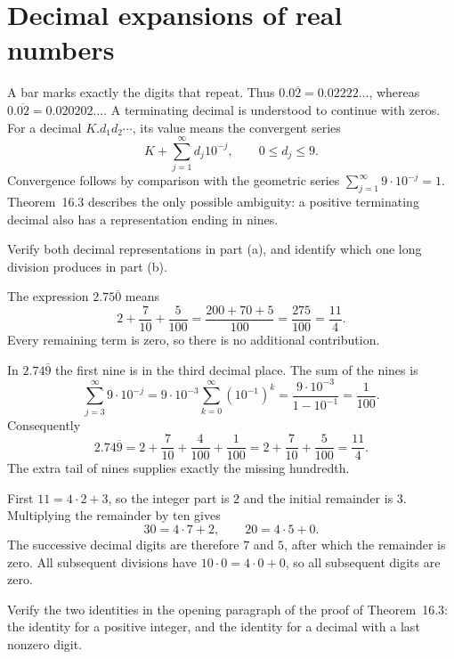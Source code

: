 \section{Decimal expansions of real numbers}
\label{sec:decimal-expansions}
A bar marks exactly the digits that repeat. Thus
$0.0\overline{2}=0.02222\ldots$, whereas
$0.\overline{02}=0.020202\ldots$.
A terminating decimal is understood to continue with zeros.
For a decimal $K.d_1d_2\cdots$, its value means the convergent series
\[
 K+\sum_{j=1}^{\infty}d_j10^{-j},\qquad 0\le d_j\le9.
\]
Convergence follows by comparison with the geometric series
$\sum_{j=1}^{\infty}9\cdot10^{-j}=1$.
Theorem~16.3 describes the only possible ambiguity: a positive
terminating decimal also has a representation ending in nines.

\goal Verify both decimal representations in part (a), and identify
which one long division produces in part (b).

The expression $2.75\overline{0}$ means
\[
 2+\frac7{10}+\frac5{100}
 =\frac{200+70+5}{100}
 =\frac{275}{100}=\frac{11}{4}.
\]
Every remaining term is zero, so there is no additional contribution.

In $2.74\overline{9}$ the first nine is in the third decimal place.
The sum of the nines is
\[
 \sum_{j=3}^{\infty}9\cdot10^{-j}
 =9\cdot10^{-3}\sum_{k=0}^{\infty}(10^{-1})^k
 =\frac{9\cdot10^{-3}}{1-10^{-1}}
 =\frac1{100}.
\]
Consequently
\[
 2.74\overline{9}
 =2+\frac7{10}+\frac4{100}+\frac1{100}
 =2+\frac7{10}+\frac5{100}
 =\frac{11}{4}.
\]
The extra tail of nines supplies exactly the missing hundredth.

First $11=4\cdot2+3$, so the integer part is $2$ and the initial
remainder is $3$. Multiplying the remainder by ten gives
\[
 30=4\cdot7+2,\qquad 20=4\cdot5+0.
\]
The successive decimal digits are therefore $7$ and $5$, after
which the remainder is zero. All subsequent divisions have
$10\cdot0=4\cdot0+0$, so all subsequent digits are zero.

\goal Verify the two identities in the opening paragraph of the
proof of Theorem~16.3: the identity for a positive integer, and the
identity for a decimal with a last nonzero digit.

